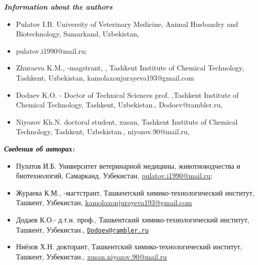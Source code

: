 \begin{center}
\emph{{\bfseries Information about the authors}}
\end{center}

\begin{itemize}
\item
Pulatov I.B. University of Veterinary Medicine, Animal Husbandry and
Biotechnology, Samarkand, Uzbekistan,

\item
pulatov.i1990@mail.ru;

\item
Zhuraeva K.M., -magstrant, , Tashkent Institute of Chemical Technology,
Tashkent, Uzbekistan, kamolaxonjurayeva193@gmail.com

\item
Dodaev K.O. - Doctor of Technical Sciences prof. ,Tashkent Institute of
Chemical Technology, Tashkent, Uzbekistan., Dodoev@rambler.ru,

\item
Niyozov Kh.N. doctoral student, xusan, Tashkent Institute of Chemical
Technology, Tashkent, Uzbekistan., niyozov.90@mail.ru,
\end{itemize}

\begin{center}
\emph{{\bfseries Сведения об авторах:}}
\end{center}

\begin{itemize}
\item
Пулатов И.Б. Университет ветеринарной медицины, животноводчества и
биотехнологий, Самарканд, Узбекистан,
\href{mailto:pulatov.i1990@mail.ru}{\ul{pulatov.i1990@mail.ru}};

\item
Жураева К.М., -магтстрант, Ташкентский химико-технологический институт,
Ташкент, Узбекистан,
\href{mailto:kamolaxonjurayeva193@gmail.com}{\ul{kamolaxonjurayeva193@gmail.com}}

\item
Додаев К.О.- д.т.н. проф., Ташкентский химико-технологический институт,
Ташкент, Узбекистан.,
\href{mailto:Dodoev@rambler.ru}{\nolinkurl{Dodoev@rambler.ru}}

\item
Ниёзов Х.Н. докторант, Ташкентский химико-технологический институт,
Ташкент, Узбекистан.,
\href{mailto:xusan.niyozov.90@mail.ru}{\ul{xusan.niyozov.90@mail.ru}}
\end{itemize}
